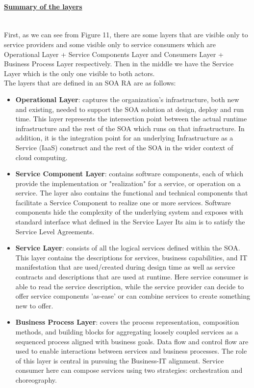 \documentclass[10pt,a4paper]{article}
\newcommand{\myparagraph}[1]{\paragraph{\uline{#1}}\mbox{}\\[0.05in]}
\begin{document}
\pagebreak
\myparagraph{Summary of the layers}
First, as we can see from Figure 11, there are some layers that are visible only to service providers and some visible only to service consumers which are Operational Layer + Service Components Layer and Consumers Layer + Business Process Layer respectively. Then in the middle we have the Service Layer which is the only one visible to both actors. \\
The layers that are defined in an SOA RA are as follows:
\begin{itemize}
	\item \textbf{Operational Layer}: captures the organization's infrastructure, both new and existing, needed to support the SOA solution at design, deploy and run time. This layer represents the intersection point between the actual runtime infrastructure and the rest of the SOA which runs on that infrastructure. In addition, it is the integration point for an underlying Infrastructure as a Service (IaaS) construct and the rest of the SOA in the wider context of cloud computing.
	\item \textbf{Service Component Layer}: contains software components, each of which provide the implementation or "realization" for a service, or operation on a service. The layer also contains the functional and technical components that facilitate a Service Component to realize one or more services. Software components hide the complexity of the underlying system and exposes with standard interface what defined in the Service Layer Its aim is to satisfy the Service Level Agreements.
	\item \textbf{Service Layer}: consists of all the logical services defined within the SOA. This layer contains the descriptions for services, business capabilities, and IT manifestation that are used/created during design time as well as service contracts and descriptions that are used at runtime. Here service consumer is able to read the service description, while the service provider can decide to offer service components 'as-ease' or can combine services to create something new to offer.
	\item \textbf{Business Process Layer}: covers the process representation, composition methods, and building blocks for aggregating loosely coupled services as a sequenced process aligned with business goals. Data flow and control flow are used to enable interactions between services and business processes. The role of this layer is central in pursuing the Business-IT alignment. Service consumer here can compose services using two strategies: orchestration and choreography. 

\end{itemize}
\end{document}
